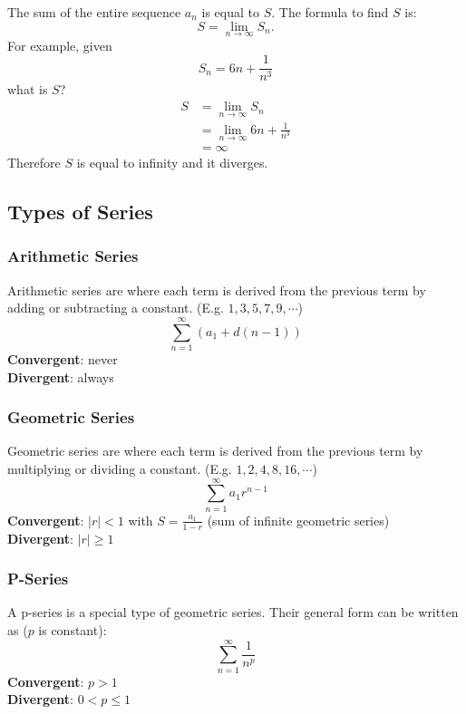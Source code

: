 \documentclass[12pt]{article}
\begin{document}
                The sum of the entire sequence $a_n$ is equal to $S$. The formula to find $S$ is:
                \[ S = \lim_{n \to \infty} S_n. \]
                For example, given
                \[ S_n = 6n + \frac{1}{n^3} \]
                what is $S$?
                \begin{align*}
                    S &= \lim_{n \to \infty} S_n \\
                    &= \lim_{n \to \infty} 6n + \frac{1}{n^3} \\[6pt]
                    &= \infty
                \end{align*}
                Therefore $S$ is equal to infinity and it diverges.

        \subsection{Types of Series}
            \subsubsection{Arithmetic Series}
                Arithmetic series are where each term is derived from the previous term by adding or subtracting a constant. (E.g. $1, 3, 5, 7, 9, \cdots$)
                \[ \sum_{n=1}^\infty (a_1 + d(n-1)) \]
                \textbf{Convergent}: never
                \\ \textbf{Divergent}: always

            \subsubsection{Geometric Series}
                Geometric series are where each term is derived from the previous term by multiplying or dividing a constant. (E.g. $1, 2, 4, 8, 16, \cdots$)
                \[ \sum_{n=1}^\infty a_1r^{n-1} \]
                \textbf{Convergent}: $|r| < 1$ with $S = \frac{a_1}{1-r}$ (sum of infinite geometric series)
                \\ \textbf{Divergent}: $|r| \ge 1$

            \subsubsection{P-Series}
                A p-series is a special type of geometric series. Their general form can be written as ($p$ is constant):
                \[ \sum_{n=1}^\infty \frac{1}{n^p} \]
                \textbf{Convergent}: $p > 1$
                \\ \textbf{Divergent}: $0 < p \le 1$
\end{document}
